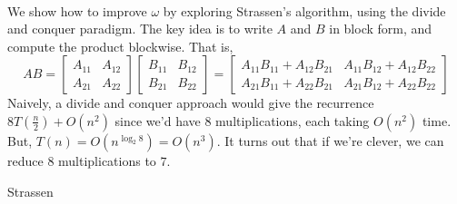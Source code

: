         \\
        We show how to improve \(\omega\) by exploring Strassen's algorithm, using the divide and conquer paradigm. The key idea is to write \(A\) and \(B\) in block form, and compute the product blockwise. That is, 
        \begin{equation*}
            AB=\begin{bmatrix}
                A_{11} & A_{12} \\
                A_{21} & A_{22}
            \end{bmatrix}
            \begin{bmatrix}
                B_{11} & B_{12} \\
                B_{21} & B_{22}
            \end{bmatrix}=
            \begin{bmatrix}
                A_{11}B_{11}+A_{12}B_{21} & A_{11}B_{12}+A_{12}B_{22} \\
                A_{21}B_{11}+A_{22}B_{21} & A_{21}B_{12}+A_{22}B_{22} 
            \end{bmatrix}
        \end{equation*}
        Naively, a divide and conquer approach would give the recurrence \(8T\left(\frac{n}{2}\right)+O(n^2)\) since we'd have \(8\) multiplications, each taking \(O(n^2)\) time. But, \(T(n)=O(n^{\log_2 8})=O(n^3)\). It turns out that if we're clever, we can reduce \(8\) multiplications to \(7\).
        \begin{algorithm}[H] 
            \begin{algorithmic}[1]
                    \State \Return
                \EndProcedure 
            \end{algorithmic}
            \caption{Strassen}
            \label{alg:strassen}
        \end{algorithm}